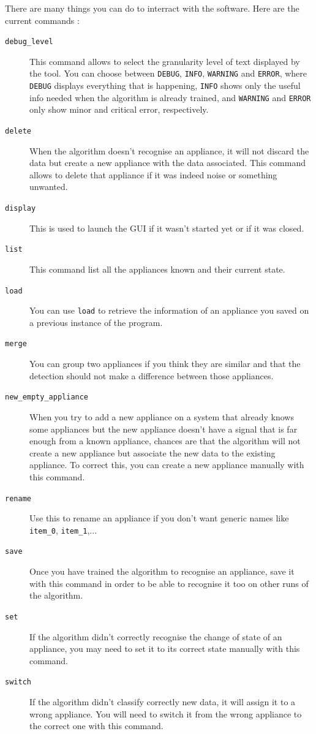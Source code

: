 There are many things you can do to interract with the software. Here are the current commands :
\begin{description}
\item[\texttt{debug\_level}]This command allows to select the granularity level of text displayed by the tool. You can choose between \texttt{DEBUG}, \texttt{INFO}, \texttt{WARNING} and \texttt{ERROR}, where \texttt{DEBUG} displays everything that is happening, \texttt{INFO} shows only the useful info needed when the algorithm is already trained, and \texttt{WARNING} and \texttt{ERROR} only show minor and critical error, respectively.
\item[\texttt{delete}] When the algorithm doesn't recognise an appliance, it will not discard the data but create a new appliance with the data associated. This command allows to delete that appliance if it was indeed noise or something unwanted.
\item[\texttt{display}] This is used to launch the GUI if it wasn't started yet or if it was closed.
\item[\texttt{list}] This command list all the appliances known and their current state.
\item[\texttt{load}] You can use \texttt{load} to retrieve the information of an appliance you saved on a previous instance of the program.
\item[\texttt{merge}] You can group two appliances if you think they are similar and that the detection should not make a difference between those appliances.
\item[\texttt{new\_empty\_appliance}] When you try to add a new appliance on a system that already knows some appliances but the new appliance doesn't have a signal that is far enough from a known appliance, chances are that the algorithm will not create a new appliance but associate the new data to the existing appliance. To correct this, you can create a new appliance manually with this command.
\item[\texttt{rename}] Use this to rename an appliance if you don't want generic names like \texttt{item\_0}, \texttt{item\_1},...
\item[\texttt{save}] Once you have trained the algorithm to recognise an appliance, save it with this command in order to be able to recognise it too on other runs of the algorithm.
\item[\texttt{set}] If the algorithm didn't correctly recognise the change of state of an appliance, you may need to set it to its correct state manually with this command.
\item[\texttt{switch}] If the algorithm didn't classify correctly new data, it will assign it to a wrong appliance. You will need to switch it from the wrong appliance to the correct one with this command.
\end{description}

